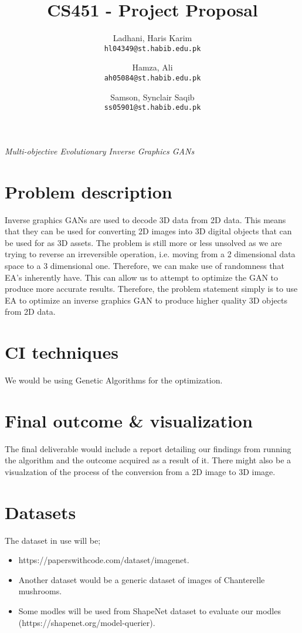 \documentclass[11pt,letterpaper]{article}
\begin{document}
\title{CS451 - Project Proposal}
\author{Ladhani, Haris Karim\\
\texttt{hl04349@st.habib.edu.pk}
\and
Hamza, Ali\\
\texttt{ah05084@st.habib.edu.pk}
\and
Samson, Synclair Saqib\\
\texttt{ss05901@st.habib.edu.pk}
}
\maketitle

\begin{center}
  \emph{Multi-objective Evolutionary Inverse Graphics GANs}
\end{center}


\section*{Problem description}
Inverse graphics GANs are used to decode 3D data from 2D data. This means that they can be used for converting 2D images into 3D digital objects that can be used for as 3D assets. The problem is still more or less unsolved as we are trying to reverse an irreversible operation, i.e. moving from a 2 dimensional data space to a 3 dimensional one. Therefore, we can make use of randomness that EA's inherently have. This can allow us to attempt to optimize the GAN to produce more accurate results. Therefore, the problem statement simply is to use EA to optimize an inverse graphics GAN to produce higher quality 3D objects from 2D data.

\section*{CI techniques}
We would be using Genetic Algorithms for the optimization.

\section*{Final outcome \& visualization}
The final deliverable would include a report detailing our findings from running the algorithm and the outcome acquired as a result of it. There might also be a visualzation of the process of the conversion from a 2D image to 3D image.

\section*{Datasets} 
The dataset in use will be;
\begin{itemize}
    \item https://paperswithcode.com/dataset/imagenet.
    \item Another dataset would be a generic dataset of images of Chanterelle mushrooms.
    \item Some modles will be used from ShapeNet dataset to evaluate our modles (https://shapenet.org/model-querier).
\end{itemize}
\end{document}
